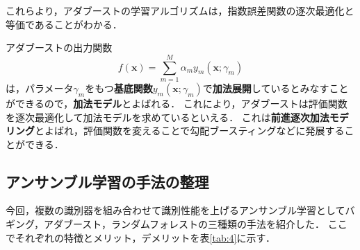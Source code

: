 \documentclass[dvipdfmx]{jreport}
\begin{document}
これらより，アダブーストの学習アルゴリズムは，指数誤差関数の逐次最適化と等価であることがわかる．

アダブーストの出力関数
\begin{equation}
    f(\bm{x}) = \sum_{m=1}^{M} \alpha_m y_m(\bm{x};\gamma_m)
\end{equation}
は，パラメータ$\gamma_m$をもつ\textbf{基底関数}$y_m(\bm{x};\gamma_m)$で\textbf{加法展開}しているとみなすことができるので，\textbf{加法モデル}とよばれる．
これにより，アダブーストは評価関数を逐次最適化して加法モデルを求めているといえる．
これは\textbf{前進逐次加法モデリング}とよばれ，評価関数を変えることで勾配ブースティングなどに発展することができる．

\newpage
\subsection{アンサンブル学習の手法の整理}
今回，複数の識別器を組み合わせて識別性能を上げるアンサンブル学習としてバギング，アダブースト，ランダムフォレストの三種類の手法を紹介した．
ここでそれぞれの特徴とメリット，デメリットを表\ref{tab:4}に示す．
\end{document}

